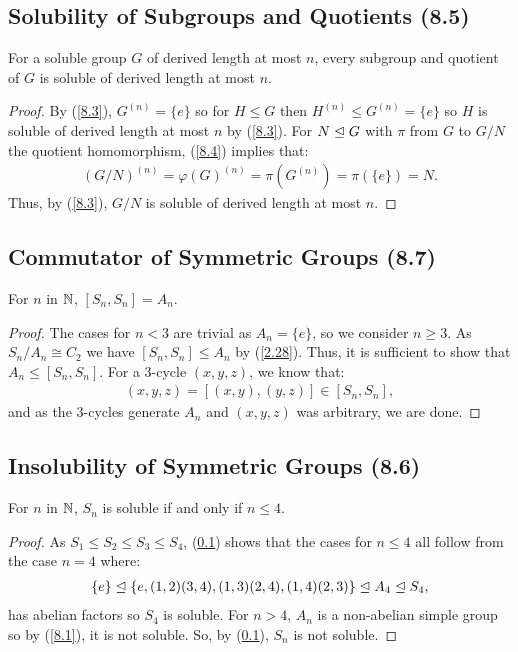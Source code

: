 \subsection{Solubility of Subgroups and Quotients (8.5)} \label{8.5}

For a soluble group $G$ of derived length at most $n$, every
subgroup and quotient of $G$ is soluble of derived length at
most $n$.

\begin{proof}
    By (\ref{8.3}), $G^{(n)} = \{e\}$ so for $H \leq G$ then
    $H^{(n)} \leq G^{(n)} = \{e\}$ so $H$ is soluble of derived
    length at most $n$ by (\ref{8.3}). For $N \trianglelefteq G$
    with $\pi$ from $G$ to $G / N$ the quotient homomorphism,
    (\ref{8.4}) implies that: \begin{align*}
        (G / N)^{(n)} = \varphi(G)^{(n)} = \pi(G^{(n)}) 
        = \pi(\{e\}) = N. \tag{8.4}
    \end{align*} Thus, by (\ref{8.3}), $G / N$ is soluble 
    of derived length at most $n$.
\end{proof}

\subsection{Commutator of Symmetric Groups (8.7)} \label{8.7}

For $n$ in $\mathbb{N}$, $[S_n, S_n] = A_n$.

\begin{proof}
    The cases for $n < 3$ are trivial as $A_n = \{e\}$, 
    so we consider $n \geq 3$.
    As $S_n / A_n \cong C_2$ we have $[S_n, S_n] \leq A_n$ by (\ref{2.28}). 
    Thus, it is sufficient to show that $A_n \leq [S_n, S_n]$. For
    a 3-cycle $(x, y, z)$, we know that: \begin{align*}
        (x, y, z) = [(x, y), (y, z)] \in [S_n, S_n],
    \end{align*} and as the 3-cycles generate $A_n$ and
    $(x, y, z)$ was arbitrary, we are done.
\end{proof}

\subsection{Insolubility of Symmetric Groups (8.6)} \label{8.6}

For $n$ in $\mathbb{N}$, $S_n$ is soluble if and only if $n \leq 4$.

\begin{proof}
    As $S_1 \leq S_2 \leq S_3 \leq S_4$, (\ref{8.5}) shows that the
    cases for $n \leq 4$ all follow from the case $n = 4$ where:
    \begin{align*}
        \{e\} \trianglelefteq \{e, (1, 2)(3, 4), (1, 3)(2, 4), (1, 4)(2, 3)\}
        \trianglelefteq A_4 \trianglelefteq S_4,
    \end{align*} has abelian factors so $S_4$ is soluble.
    For $n > 4$, $A_n$ is a non-abelian simple group
    so by (\ref{8.1}), it is not soluble. So, by (\ref{8.5}),
    $S_n$ is not soluble.
\end{proof}

